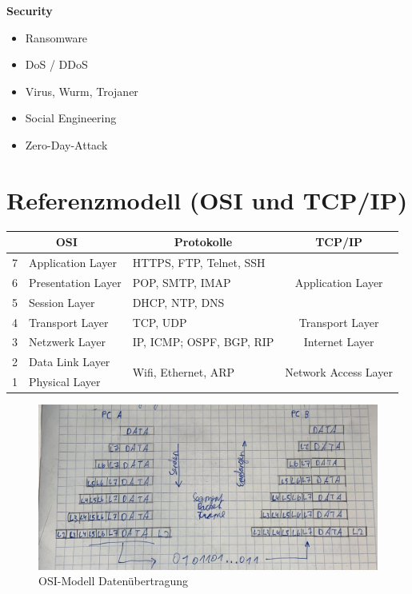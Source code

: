 \textbf{Security}
\begin{itemize}
	\item Ransomware
	\item DoS / DDoS
	\item Virus, Wurm, Trojaner
	\item Social Engineering
	\item Zero-Day-Attack
\end{itemize}

\section{Referenzmodell (OSI und TCP/IP)}
\begin{table}[H]
	\begin{tabular}{|cl|l|c|}
		\hline
		\multicolumn{2}{|c|}{OSI} & \multicolumn{1}{c|}{Protokolle} & TCP/IP \\ \hline
		\multicolumn{1}{|c|}{7} & Application Layer & HTTPS, FTP, Telnet, SSH & \multirow{3}{*}{Application Layer} \\ \cline{1-3}
		\multicolumn{1}{|c|}{6} & Presentation Layer & POP, SMTP, IMAP &  \\ \cline{1-3}
		\multicolumn{1}{|c|}{5} & Session Layer & DHCP, NTP, DNS &  \\ \hline
		\multicolumn{1}{|c|}{4} & Transport Layer & TCP, UDP & Transport Layer \\ \hline
		\multicolumn{1}{|c|}{3} & Netzwerk Layer & IP, ICMP; OSPF, BGP, RIP & Internet Layer \\ \hline
		\multicolumn{1}{|c|}{2} & Data Link Layer & \multirow{2}{*}{Wifi, Ethernet, ARP} & \multirow{2}{*}{Network Access Layer} \\ \cline{1-2}
		\multicolumn{1}{|c|}{1} & Physical Layer &  &  \\ \hline
	\end{tabular}
\end{table}

\begin{figure}[H]
	\centering
	\includegraphics[width=0.9\linewidth]{figures/datenuber.jpeg}
	\caption{OSI-Modell Datenübertragung}
	\label{fig:osi_datenuber}
\end{figure}

